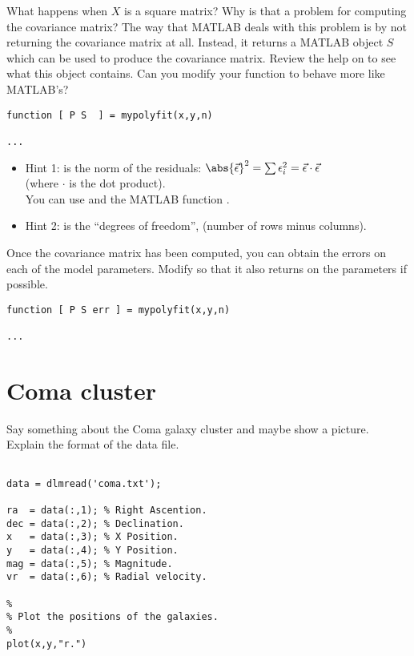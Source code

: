 What happens when $X$ is a square matrix? Why is that a problem for computing
the covariance matrix? The way that MATLAB deals with this problem is by not
returning the covariance matrix at all. Instead, it returns a MATLAB object
$S$ which can be used to produce the covariance matrix. Review the help on
 to see what this object contains. Can you modify your
 function to behave more like MATLAB's?

\begin{verbatim}
function [ P S  ] = mypolyfit(x,y,n)

...
\end{verbatim}

\begin{itemize}
\item Hint 1:  is the norm of the residuals:
$\abs{\vec{\epsilon}}^2 = \sum \epsilon_i^2 = \vec{\epsilon} \cdot \vec{\epsilon}$ \\
(where $\cdot$ is the dot product).\\
You can use  and the MATLAB function .
\item Hint 2:  is the ``degrees of freedom'', (number of rows minus columns).
\end{itemize}


Once the covariance matrix has been computed, you can obtain the errors
on each of the model parameters. Modify  so that it
also returns on the parameters if possible.

\begin{verbatim}
function [ P S err ] = mypolyfit(x,y,n)

...
\end{verbatim}




\section{Coma cluster}

Say something about the Coma galaxy cluster and maybe show a picture.
Explain the format of the data file.


\begin{verbatim}

data = dlmread('coma.txt');

ra  = data(:,1); % Right Ascention.
dec = data(:,2); % Declination.
x   = data(:,3); % X Position.
y   = data(:,4); % Y Position.
mag = data(:,5); % Magnitude.
vr  = data(:,6); % Radial velocity.

%
% Plot the positions of the galaxies.
%
plot(x,y,"r.")

\end{verbatim}

















